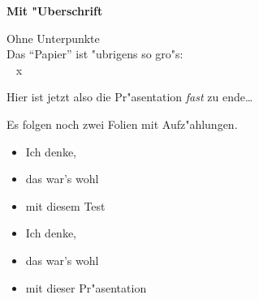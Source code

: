 \documentclass[accentcolor=tud1a,colorbacktitle,inverttitle,landscape,german,presentation,t]{tudbeamer}
\begin{document}
	\begin{frame}
		{\bf Mit "Uberschrift}

		Ohne Unterpunkte\\

		Das "`Papier"' ist "ubrigens so gro"s:\\
		\the\paperheight ~ x~ \the\paperwidth
	\end{frame}

	\begin{frame}
		Hier ist jetzt also die Pr"asentation \emph{fast}
		zu ende\dots
		
		Es folgen noch zwei Folien mit Aufz"ahlungen.
	\end{frame}

	\begin{frame}
		\begin{itemize}
			\item Ich denke,
			\item das war's wohl
			\item mit diesem Test
		\end{itemize}
	\end{frame}

	\begin{frame}
		\begin{itemize}
			\item Ich denke,
			\item das war's wohl
			\item mit dieser Pr"asentation
		\end{itemize}
	\end{frame}
\end{document}
